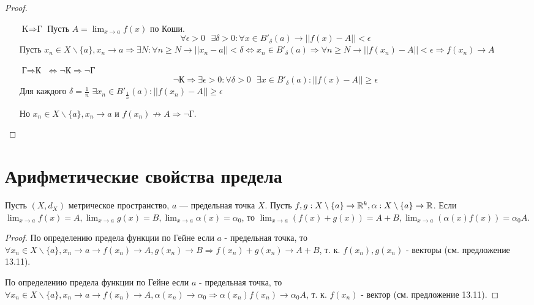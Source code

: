      \begin{proof}
    	$ $
    	
    	\begin{itemize}
    		\item[$\text{K} \Rightarrow \text{Г}$] Пусть $A = \lim_{x \to a} f(x)$ по Коши.
    		\[ \forall \epsilon > 0 \text{ } \exists \delta > 0: \forall x \in B'_{\delta}(a) \rightarrow ||f(x) - A|| < \epsilon \]
    		Пусть $x_n \in X \backslash \{a\}, x_n \to a \Rightarrow \exists N: \forall n \geqslant N \rightarrow ||x_n - a|| < \delta \Leftrightarrow x_n \in B'_{\delta}(a) \Rightarrow \forall n \geqslant N \rightarrow ||f(x_n) - A|| < \epsilon \Rightarrow f(x_n) \rightarrow A$
    		\item[$\text{Г} \Rightarrow \text{К}$] $\Leftrightarrow \neg \text{К} \Rightarrow \neg \text{Г}$
    		\[ \neg\text{К} \Rightarrow \exists \epsilon > 0 : \forall \delta > 0 \text{ } \exists x \in B'_{\delta}(a) : ||f(x) - A|| \geqslant \epsilon \]
    		Для каждого $\delta = \frac{1}{n}$ $\exists x_n \in B'_{\frac{1}{n}}(a) : ||f(x_n) - A|| \geqslant \epsilon$
    		
    		Но $x_n \in X \backslash \{a\}, x_n \to a$ и $f(x_n) \not\to A \Rightarrow \neg \text{Г}$.         
    	\end{itemize}
    \end{proof}
    
    \section{Арифметические свойства предела}
    
    \begin{theorem}
    	Пусть $(X, d_X)$ метрическое пространство, $a$ — предельная
    	точка $X$. Пусть $f, g : X \setminus \{a\} \rightarrow \mathbb R^k,  \alpha : X \setminus \{a\} \rightarrow \mathbb R$. Если $\displaystyle \lim_{x \to a} f(x) = A, \lim_{x \to a} g(x) = B, \lim_{x \to a} \alpha(x) = \alpha_0$, то $\displaystyle \lim_{x \to a} (f(x) + g(x)) = A + B, \lim_{x \to a} (\alpha(x)f(x)) = \alpha_0 A.$
    \end{theorem}
    
    \begin{proof}
    	По определению предела функции по Гейне если $a$ - предельная точка, то $\forall x_n \in X \backslash \{a\}, x_n \to a \rightarrow f(x_n) \to A, g(x_n) \to B \Rightarrow f(x_n) + g(x_n) \to A + B$, т. к. $f(x_n), g(x_n)$ - векторы (см. предложение 13.11).
    	
    	По определению предела функции по Гейне если $a$ - предельная точка, то $\forall x_n \in X \backslash \{a\}, x_n \to a \rightarrow f(x_n) \to A, \alpha(x_n) \to \alpha_0 \Rightarrow \alpha(x_n) f(x_n) \to \alpha_0 A$, т. к. $f(x_n)$ - вектор (см. предложение 13.11).
    \end{proof}
    

